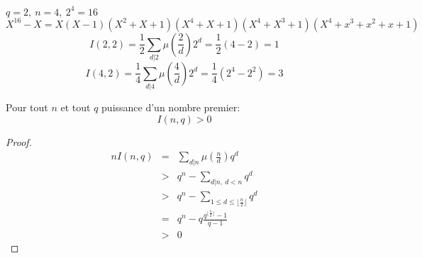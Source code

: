 \begin{example}
	$ q = 2, \ n = 4, \ 2^4 = 16 $
	$$	X ^16 - X = X(X-1)(X^2 + X + 1)(X^4 + X + 1)(X^4 + X^3 + 1)(X^4 + x^3 + x^2 + x + 1) $$
	$$	I(2,2) = \frac{1}{2}\sum_{d|2} \mu(\frac{2}{d}) 2^d = \frac{1}{2}(4-2) = 1$$
	$$	I(4,2) = \frac{1}{4}\sum_{d|4} \mu(\frac{4}{d}) 2^d = \frac{1}{4}(2^4 - 2^2) = 3$$
\end{example}



\begin{coro}
	Pour tout $n$ et tout $q$ puissance d'un nombre premier:
	$$ I (n, q) > 0 $$
\end{coro}


\begin{proof}
	\begin{eqnarray*}
		n I(n, q) & = & \sum_{d|n} \mu(\frac{n}{d}) q^d \\
		&>& q^n - \sum_{d|n,\ d < n} q^d \\
		&>& q^n - \sum_{1 \leq d\leq \lfloor \frac n 2 \rfloor} q^d \\
		&=& q^n - q\frac{q^{\lfloor \frac n 2 \rfloor} - 1}{q-1} \\
		&>& 0
	\end{eqnarray*}
\end{proof}

